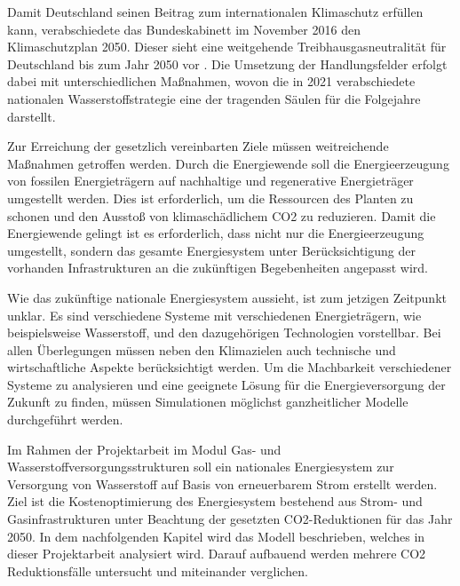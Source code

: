 Damit Deutschland seinen Beitrag zum internationalen Klimaschutz erfüllen kann, verabschiedete das Bundeskabinett im November 2016 den Klimaschutzplan 2050. Dieser sieht eine weitgehende Treibhausgasneutralität für Deutschland bis zum Jahr 2050 vor . 
Die Umsetzung der Handlungsfelder erfolgt dabei mit unterschiedlichen Maßnahmen, wovon die in 2021 verabschiedete nationalen Wasserstoffstrategie eine der tragenden Säulen für die Folgejahre darstellt.  

Zur Erreichung der gesetzlich vereinbarten Ziele müssen weitreichende Maßnahmen getroffen werden.
Durch die Energiewende soll die Energieerzeugung von fossilen Energieträgern auf nachhaltige und regenerative Energieträger umgestellt werden.  Dies ist erforderlich, um die Ressourcen des Planten zu schonen und den Ausstoß von klimaschädlichem CO2 zu reduzieren. Damit die Energiewende gelingt ist es erforderlich, dass nicht nur die Energieerzeugung umgestellt, sondern das gesamte Energiesystem unter Berücksichtigung der vorhanden Infrastrukturen an die zukünftigen Begebenheiten angepasst wird.

Wie das zukünftige nationale Energiesystem aussieht, ist zum jetzigen Zeitpunkt unklar. Es sind verschiedene Systeme mit verschiedenen Energieträgern, wie beispielsweise Wasserstoff, und den dazugehörigen Technologien vorstellbar. 
Bei allen Überlegungen müssen neben den Klimazielen auch technische und wirtschaftliche Aspekte berücksichtigt werden. 
Um die Machbarkeit verschiedener Systeme zu analysieren und eine geeignete Lösung für die Energieversorgung der Zukunft zu finden, müssen Simulationen möglichst ganzheitlicher Modelle durchgeführt werden.

Im Rahmen der Projektarbeit im Modul Gas- und Wasserstoffversorgungsstrukturen soll ein nationales Energiesystem zur Versorgung von Wasserstoff auf Basis von erneuerbarem Strom erstellt werden. Ziel ist die Kostenoptimierung des Energiesystem bestehend aus Strom- und Gasinfrastrukturen unter Beachtung der gesetzten CO2-Reduktionen für das Jahr 2050. In dem nachfolgenden Kapitel wird das Modell beschrieben, welches in dieser Projektarbeit analysiert wird. Darauf aufbauend werden mehrere CO2 Reduktionsfälle untersucht und miteinander verglichen.